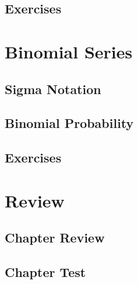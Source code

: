 \subsection{Exercises}

\newpage
\section{Binomial Series}
\noindent{}
\subsection{Sigma Notation}
\subsection{Binomial Probability}
\subsection{Exercises}

\newpage
\section{Review}
\subsection{Chapter Review}
\subsection{Chapter Test}

